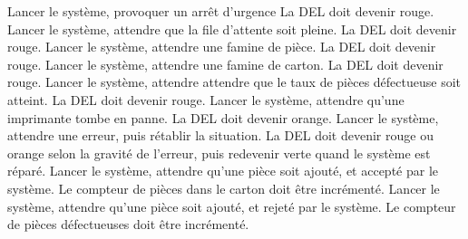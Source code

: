 {Lancer le système, provoquer un arrêt d'urgence}
{La DEL doit devenir rouge.}
{Lancer le système, attendre que la file d'attente soit pleine.}
{La DEL doit devenir rouge.}
{Lancer le système, attendre une famine de pièce.}
{La DEL doit devenir rouge.}
{Lancer le système, attendre une famine de carton.}
{La DEL doit devenir rouge.}
{Lancer le système, attendre attendre que le taux de pièces défectueuse soit
atteint.}
{La DEL doit devenir rouge.}
{Lancer le système, attendre qu'une imprimante tombe en panne.}
{La DEL doit devenir orange.}
{Lancer le système, attendre une erreur, puis rétablir la situation.}
{La DEL doit devenir rouge ou orange selon la gravité de l'erreur, puis
redevenir verte quand le système est réparé.}
{Lancer le système, attendre qu'une pièce soit ajouté, et accepté par le système.}
{Le compteur de pièces dans le carton doit être incrémenté.}
{Lancer le système, attendre qu'une pièce soit ajouté, et rejeté par le système.}
{Le compteur de pièces défectueuses doit être incrémenté.}
